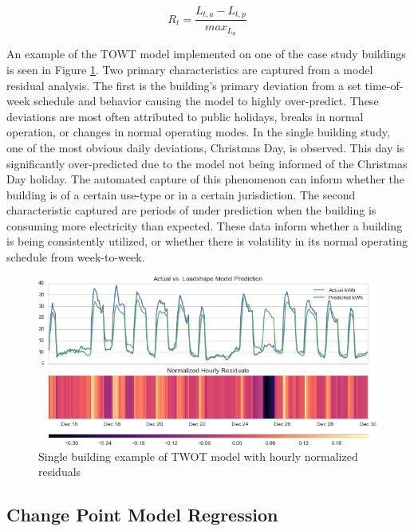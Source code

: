 \begin{equation}
\label{eq:residualerror}
R_t = \frac{L_{t,a} - L_{t,p}}{max_{L_a}}
\end{equation}

An example of the TOWT model implemented on one of the case study buildings is seen in Figure \ref{fig:loadshape_single}. Two primary characteristics are captured from a model residual analysis. The first is the building's primary deviation from a set time-of-week schedule and behavior causing the model to highly over-predict. These deviations are most often attributed to public holidays, breaks in normal operation, or changes in normal operating modes. In the single building study, one of the most obvious daily deviations, Christmas Day, is observed. This day is significantly over-predicted due to the model not being informed of the Christmas Day holiday. The automated capture of this phenomenon can inform whether the building is of a certain use-type or in a certain jurisdiction. The second characteristic captured are periods of under prediction when the building is consuming more electricity than expected. These data inform whether a building is being consistently utilized, or whether there is volatility in its normal operating schedule from week-to-week. 

\begin{figure}[ht!]
\begin{center}
\includegraphics[width=1\columnwidth]{figures/loadshape_example/loadshape_example}
\caption{Single building example of TWOT model with hourly normalized residuals
\label{fig:loadshape_single}%
}
\end{center}
\end{figure}

\subsection{Change Point Model Regression}
\label{sec:changepointmodels}

